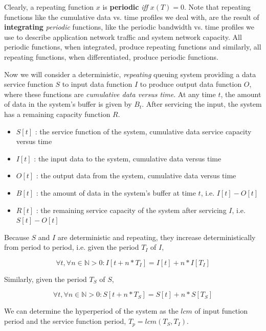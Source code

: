 Clearly, a repeating function $x$ is \textbf{periodic} \emph{iff}
$x(T)=0$.  Note that repeating functions like the cumulative
data vs. time profiles we deal with, are the result of \textbf{integrating}
\emph{periodic} functions, like the periodic bandwidth vs. time profiles we
use to describe application network traffic and system network
capacity.  All periodic functions, when integrated, produce repeating
functions and similarly, all repeating functions, when differentiated,
produce periodic functions.

Now we will consider a deterministic, \emph{repeating} queuing system
providing a data service function $S$ to input data function
$I$ to produce output data function $O$, where these
functions are \emph{cumulative data versus time}.  At any time $t$,
the amount of data in the system's buffer is given by $B_t$.
After servicing the input, the system has a remaining capacity
function $R$.

\begin{itemize}
\item $S[t]$ : the service function of the system, cumulative data
  service capacity versus time
\item $I[t]$ : the input data to the system, cumulative data versus
  time
\item $O[t]$ : the output data from the system, cumulative data
  versus time
\item $B[t]$ : the amount of data in the system's buffer at time
  $t$, i.e. $I[t]-O[t]$
\item $R[t]$ : the remaining service capacity of the system after
  servicing $I$, i.e. $S[t] - O[t]$
\end{itemize}

Because $S$ and $I$ are deterministic and repeating, they
increase deterministically from period to period, i.e. given the
period $T_I$ of $I$,

\begin{equation}
  \forall t, \forall n \in \mathbb{N} > 0 : I[t + n*T_I] =
  I[t] + n*I[T_I]
\end{equation}

Similarly, given the period $T_S$ of $S$,

\begin{equation}
  \forall t, \forall n \in \mathbb{N} > 0 : S[t + n*T_S] =
  S[t] + n*S[T_S]
\end{equation}

We can determine the hyperperiod of the system as the $lcm$ of
input function period and the service function period, $T_p =
lcm(T_S,T_I)$.

